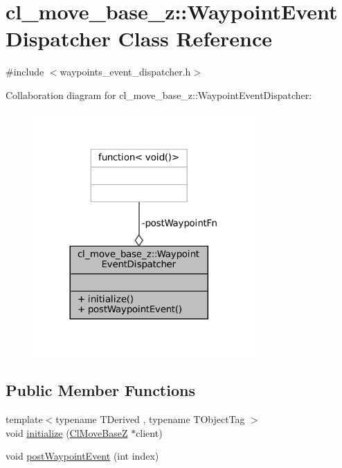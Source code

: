 \hypertarget{classcl__move__base__z_1_1WaypointEventDispatcher}{}\section{cl\+\_\+move\+\_\+base\+\_\+z\+:\+:Waypoint\+Event\+Dispatcher Class Reference}
\label{classcl__move__base__z_1_1WaypointEventDispatcher}


{\ttfamily \#include $<$waypoints\+\_\+event\+\_\+dispatcher.\+h$>$}



Collaboration diagram for cl\+\_\+move\+\_\+base\+\_\+z\+:\+:Waypoint\+Event\+Dispatcher\+:
\nopagebreak
\begin{figure}[H]
\begin{center}
\leavevmode
\includegraphics[width=240pt]{classcl__move__base__z_1_1WaypointEventDispatcher__coll__graph}
\end{center}
\end{figure}
\subsection*{Public Member Functions}
\begin{DoxyCompactItemize}
\item 
{\footnotesize template$<$typename T\+Derived , typename T\+Object\+Tag $>$ }\\void \hyperlink{classcl__move__base__z_1_1WaypointEventDispatcher_a89674461d32af85dd64ca49290dbd010}{initialize} (\hyperlink{classcl__move__base__z_1_1ClMoveBaseZ}{Cl\+Move\+BaseZ} $\ast$client)
\item 
void \hyperlink{classcl__move__base__z_1_1WaypointEventDispatcher_a6462eae610b97df2207ecd93c1544aaf}{post\+Waypoint\+Event} (int index)
\end{DoxyCompactItemize}

